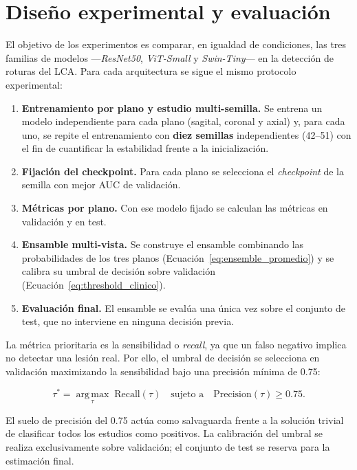 \section{Diseño experimental y evaluación}
\label{sec:diseno_experimental}

El objetivo de los experimentos es comparar, en igualdad de condiciones, las tres familias de modelos ---\textit{ResNet50}, \textit{ViT-Small} y \textit{Swin-Tiny}--- en la detección de roturas del LCA. Para cada arquitectura se sigue el mismo protocolo experimental:

\begin{enumerate}
    \item \textbf{Entrenamiento por plano y estudio multi-semilla.} Se entrena un modelo independiente para cada plano (sagital, coronal y axial) y, para cada uno, se repite el entrenamiento con \textbf{diez semillas} independientes (42--51) con el fin de cuantificar la estabilidad frente a la inicialización.
    \item \textbf{Fijación del checkpoint.} Para cada plano se selecciona el \textit{checkpoint} de la semilla con mejor AUC de validación.
    \item \textbf{Métricas por plano.} Con ese modelo fijado se calculan las métricas en validación y en test.
    \item \textbf{Ensamble multi-vista.} Se construye el ensamble combinando las probabilidades de los tres planos (Ecuación~\ref{eq:ensemble_promedio}) y se calibra su umbral de decisión sobre validación (Ecuación~\ref{eq:threshold_clinico}).
    \item \textbf{Evaluación final.} El ensamble se evalúa una única vez sobre el conjunto de test, que no interviene en ninguna decisión previa.
\end{enumerate}

La métrica prioritaria es la sensibilidad o \textit{recall}, ya que un falso negativo implica no detectar una lesión real. Por ello, el umbral de decisión se selecciona en validación maximizando la sensibilidad bajo una precisión mínima de 0.75:

\begin{equation}
\tau^* = \operatorname*{arg\,max}_{\tau} \; \mathrm{Recall}(\tau)
\quad \text{sujeto a} \quad \mathrm{Precision}(\tau) \geq 0.75 .
\label{eq:threshold_clinico}
\end{equation}

El suelo de precisión del 0.75 actúa como salvaguarda frente a la solución trivial de clasificar todos los estudios como positivos. La calibración del umbral se realiza exclusivamente sobre validación; el conjunto de test se reserva para la estimación final.

